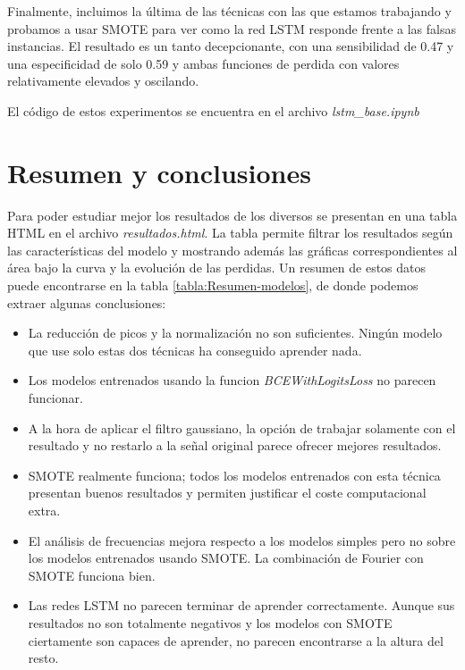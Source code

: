 Finalmente, incluimos la última de las técnicas con las que estamos trabajando y probamos a usar SMOTE para ver como la red LSTM responde frente a las falsas instancias. El resultado es un tanto decepcionante, con una sensibilidad de 0.47 y una especificidad de solo 0.59 y ambas funciones de perdida con valores relativamente elevados y oscilando.

El código de estos experimentos se encuentra en el archivo \textit{lstm\_base.ipynb}

\section{Resumen y conclusiones}

Para poder estudiar mejor los resultados de los diversos se presentan en una tabla HTML en el archivo \textit{resultados.html}. La tabla permite filtrar los resultados según las características del modelo y mostrando además las gráficas correspondientes al área bajo la curva y la evolución de las perdidas. Un resumen de estos datos puede encontrarse en la tabla  \ref{tabla:Resumen-modelos}, de donde podemos extraer algunas conclusiones:

\begin{itemize}
    \item La reducción de picos y la normalización no son suficientes. Ningún modelo que use solo estas dos técnicas ha conseguido aprender nada.
    \item Los modelos entrenados usando la funcion \textit{BCEWithLogitsLoss} no parecen funcionar.
    \item A la hora de aplicar el filtro gaussiano, la opción de trabajar solamente con el resultado y no restarlo a la señal original parece ofrecer mejores resultados.
    \item SMOTE realmente funciona; todos los modelos entrenados con esta técnica presentan buenos resultados y permiten justificar el coste computacional extra.
    \item El análisis de frecuencias mejora respecto a los modelos simples pero no sobre los modelos entrenados usando SMOTE. La combinación de Fourier con SMOTE funciona bien.
    \item Las redes LSTM no parecen terminar de aprender correctamente. Aunque sus resultados no son totalmente negativos y los modelos con SMOTE ciertamente son capaces de aprender, no parecen encontrarse a la altura del resto.
\end{itemize}

